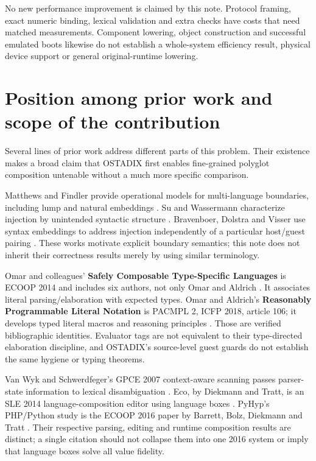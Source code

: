 \documentclass[11pt]{article}
\begin{document}
No new performance improvement is claimed by this note. Protocol framing, exact numeric binding, lexical validation and extra checks have costs that need matched measurements. Component lowering, object construction and successful emulated boots likewise do not establish a whole-system efficiency result, physical device support or general original-runtime lowering.

\clearpage

\section{Position among prior work and scope of the contribution}

Several lines of prior work address different parts of this problem. Their existence makes a broad claim that OSTADIX first enables fine-grained polyglot composition untenable without a much more specific comparison.

Matthews and Findler provide operational models for multi-language boundaries, including lump and natural embeddings \cite{matthews2007}. Su and Wassermann characterize injection by unintended syntactic structure \cite{su2006}. Bravenboer, Dolstra and Visser use syntax embeddings to address injection independently of a particular host/guest pairing \cite{bravenboer2007}. These works motivate explicit boundary semantics; this note does not inherit their correctness results merely by using similar terminology.

Omar and colleagues' \textbf{Safely Composable Type-Specific Languages} is ECOOP 2014 and includes six authors, not only Omar and Aldrich \cite{omar2014}. It associates literal parsing/elaboration with expected types. Omar and Aldrich's \textbf{Reasonably Programmable Literal Notation} is PACMPL 2, ICFP 2018, article 106; it develops typed literal macros and reasoning principles \cite{omar2018}. Those are verified bibliographic identities. Evaluator tags are not equivalent to their type-directed elaboration discipline, and OSTADIX's source-level guest guards do not establish the same hygiene or typing theorems.

Van Wyk and Schwerdfeger's GPCE 2007 context-aware scanning passes parser-state information to lexical disambiguation \cite{vanwyk2007}. Eco, by Diekmann and Tratt, is an SLE 2014 language-composition editor using language boxes \cite{eco2014}. PyHyp's PHP/Python study is the ECOOP 2016 paper by Barrett, Bolz, Diekmann and Tratt \cite{pyhyp2016}. Their respective parsing, editing and runtime composition results are distinct; a single citation should not collapse them into one 2016 system or imply that language boxes solve all value fidelity.
\end{document}
